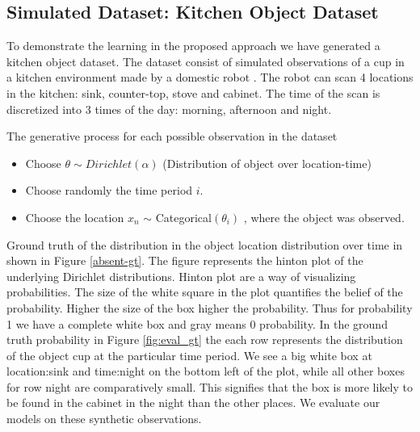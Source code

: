 \subsection{Simulated Dataset: Kitchen Object Dataset}

To demonstrate the learning in the proposed approach we have generated a kitchen object dataset. The dataset consist of simulated observations of a cup in a kitchen environment made by a domestic robot \cite{fig:eval_cup}. The robot can scan 4 locations in the kitchen: sink, counter-top, stove and cabinet. The time of the scan is discretized into 3 times of the day: morning, afternoon and night. 

The generative process for each possible observation in the dataset 
\begin{itemize}
    \item Choose $ \theta \sim Dirichlet (\alpha)$  (Distribution of object over location-time)
    \item Choose randomly the time period $i$.
	\item Choose the location $x_n$ $\sim$ Categorical$ (\theta_i)$ , where the object was observed.
	\end{itemize}

Ground truth of the distribution in the object location distribution over time in shown in Figure \ref{absent-gt}. The figure represents the hinton plot of the underlying Dirichlet distributions. Hinton plot are a way of visualizing probabilities. The size of the white square in the plot quantifies the belief of the probability. Higher the size of the box higher the probability. Thus for probability 1 we have a complete white box and gray means 0 probability. In the ground truth probability in Figure \ref{fig:eval_gt} the each row represents the distribution of the object cup at the particular time period. We see a big white box at location:sink and time:night on the bottom left of the plot, while all other boxes for row night are comparatively small. This signifies that the box is more likely to be found in the cabinet in the night than the other places.  We evaluate our models on these synthetic observations.

